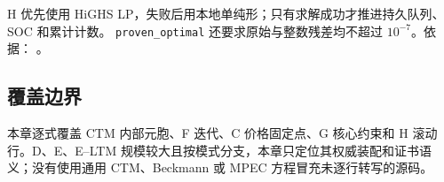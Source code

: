 H 优先使用 HiGHS LP，失败后用本地单纯形；只有求解成功才推进持久队列、SOC 和累计计数。
\texttt{proven\_optimal} 还要求原始与整数残差均不超过 $10^{-7}$。依据：
。

\subsection{覆盖边界}
本章逐式覆盖 CTM 内部元胞、F 迭代、C 价格固定点、G 核心约束和 H 滚动行。D、E、E--LTM
规模较大且按模式分支，本章只定位其权威装配和证书语义；没有使用通用 CTM、Beckmann 或 MPEC
方程冒充未逐行转写的源码。
